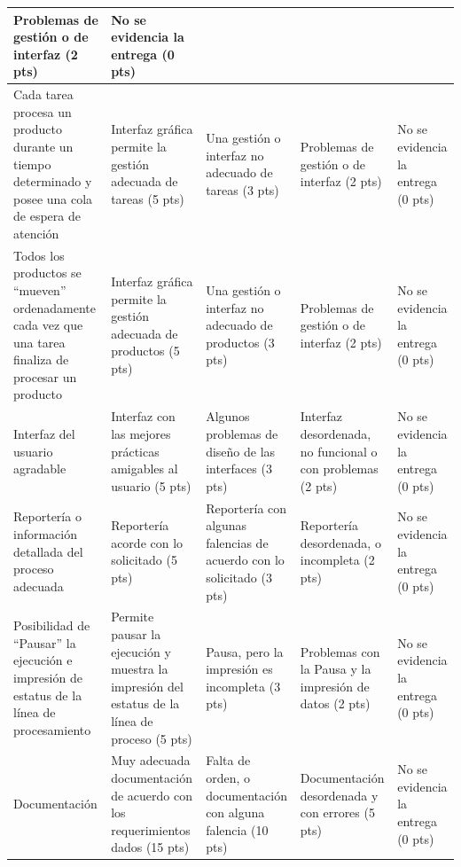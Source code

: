 \documentclass[12pt,letterpaper]{article}
\begin{document}
\begin{longtable}{|p{3.2cm}|p{3cm}|p{3cm}|p{2.5cm}|p{2.5cm}|}
Problemas de gestión o de interfaz (2 pts) &
No se evidencia la entrega (0 pts) \\
\hline
Cada tarea procesa un producto durante un tiempo determinado y posee una cola de espera de atención &
Interfaz gráfica permite la gestión adecuada de tareas (5 pts) &
Una gestión o interfaz no adecuado de tareas (3 pts) &
Problemas de gestión o de interfaz (2 pts) &
No se evidencia la entrega (0 pts) \\
\hline
Todos los productos se ``mueven'' ordenadamente cada vez que una tarea finaliza de procesar un producto &
Interfaz gráfica permite la gestión adecuada de productos (5 pts) &
Una gestión o interfaz no adecuado de productos (3 pts) &
Problemas de gestión o de interfaz (2 pts) &
No se evidencia la entrega (0 pts) \\
\hline
Interfaz del usuario agradable &
Interfaz con las mejores prácticas amigables al usuario (5 pts) &
Algunos problemas de diseño de las interfaces (3 pts) &
Interfaz desordenada, no funcional o con problemas (2 pts) &
No se evidencia la entrega (0 pts) \\
\hline
Reportería o información detallada del proceso adecuada &
Reportería acorde con lo solicitado (5 pts) &
Reportería con algunas falencias de acuerdo con lo solicitado (3 pts) &
Reportería desordenada, o incompleta (2 pts) &
No se evidencia la entrega (0 pts) \\
\hline
Posibilidad de ``Pausar'' la ejecución e impresión de estatus de la línea de procesamiento &
Permite pausar la ejecución y muestra la impresión del estatus de la línea de proceso (5 pts) &
Pausa, pero la impresión es incompleta (3 pts) &
Problemas con la Pausa y la impresión de datos (2 pts) &
No se evidencia la entrega (0 pts) \\
\hline
Documentación &
Muy adecuada documentación de acuerdo con los requerimientos dados (15 pts) &
Falta de orden, o documentación con alguna falencia (10 pts) &
Documentación desordenada y con errores (5 pts) &
No se evidencia la entrega (0 pts) \\
\hline
\end{longtable}
\end{document}
